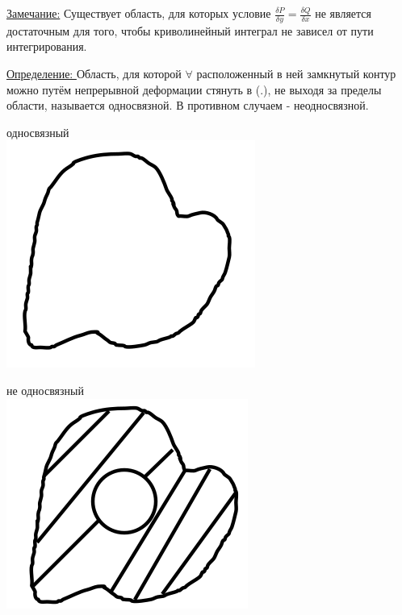 \documentclass[12pt]{article}
\let\ORIincludegraphics\includegraphics
\renewcommand{\includegraphics}[2][]{\ORIincludegraphics[scale=0.65,#1]{#2}}
\begin{document}
  \underline{Замечание:} Существует область, для которых условие $\frac{\delta P}{\delta y}=\frac{\delta Q}{\delta x}$
  не является достаточным для того, чтобы криволинейный интеграл не зависел от пути интегрирования.\\
  \par
  \underline{Определение: } Область, для которой $\forall$ расположенный в ней замкнутый контур можно путём
  непрерывной деформации стянуть в (.), не выходя за пределы области, называется односвязной. В противном
  случаем - неодносвязной.\\
  \par
  \begin{minipage}{0.5\textwidth}
    односвязный\\
    \includegraphics[scale=0.6]{8.8.2.png}
  \end{minipage}
  \hspace{1em}
  \begin{minipage}{0.5\textwidth}
      не односвязный\\
    \includegraphics[scale=0.6]{8.8.3.png}
  \end{minipage}
  \vspace{1em}
\end{document}

